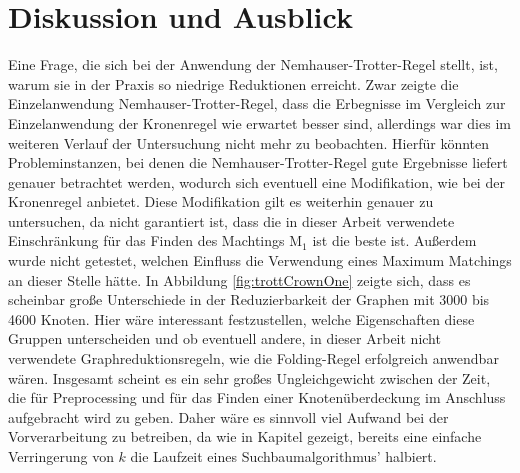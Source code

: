 
\chapter{Diskussion und Ausblick}
\label{ch:fazit}

Eine Frage, die sich bei der Anwendung der Nemhauser-Trotter-Regel stellt, ist, warum sie in der Praxis so niedrige Reduktionen erreicht. Zwar zeigte die Einzelanwendung Nemhauser-Trotter-Regel, dass die Erbegnisse im Vergleich zur Einzelanwendung der Kronenregel wie erwartet besser sind, allerdings war dies im weiteren Verlauf der Untersuchung nicht mehr zu beobachten. Hierfür könnten Probleminstanzen, bei denen die Nemhauser-Trotter-Regel gute Ergebnisse liefert genauer betrachtet werden, wodurch sich eventuell eine Modifikation, wie bei der Kronenregel anbietet. Diese Modifikation gilt es weiterhin genauer zu untersuchen, da nicht garantiert ist, dass die in dieser Arbeit verwendete Einschränkung für das Finden des Machtings M$_{1}$ ist die beste ist. Außerdem wurde nicht getestet, welchen Einfluss die Verwendung eines Maximum Matchings an dieser Stelle hätte. In Abbildung \ref{fig:trottCrownOne} zeigte sich, dass es scheinbar große Unterschiede in der Reduzierbarkeit der Graphen mit 3000 bis 4600 Knoten. Hier wäre interessant festzustellen, welche Eigenschaften diese Gruppen unterscheiden und ob eventuell andere, in dieser Arbeit nicht verwendete Graphreduktionsregeln, wie die Folding-Regel erfolgreich anwendbar wären. Insgesamt scheint es ein sehr großes Ungleichgewicht zwischen der Zeit, die für Preprocessing und für das Finden einer Knotenüberdeckung im Anschluss aufgebracht wird zu geben. Daher wäre es sinnvoll viel Aufwand bei der Vorverarbeitung zu betreiben, da wie in Kapitel \cite{ch:Einleitung:sec:Motivation} gezeigt, bereits eine einfache Verringerung von $k$ die Laufzeit eines Suchbaumalgorithmus' halbiert.

